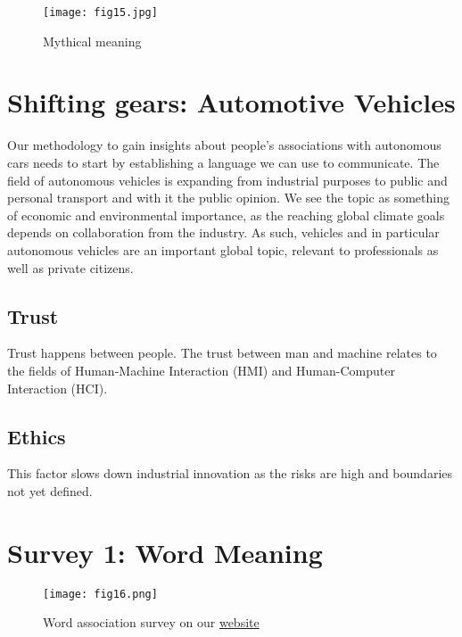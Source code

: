 \documentclass[12pt, usenames, dvipsnames]{report}
\begin{document}
\begin{flushleft}
\vspace*{1.2em}
\begin{figure}[!htbp]
  \hspace*{5em}
  \texttt{[image: fig15.jpg]}
  \caption{Mythical meaning}
  \label{fig:figure15}
\end{figure}
\vspace*{1.2em}


\section{Shifting gears: Automotive Vehicles}

Our methodology to gain insights about people's associations with autonomous cars needs to start by establishing a language we can use to communicate. 
The field of autonomous vehicles is expanding from industrial purposes to public and personal transport and with it the public opinion.
We see the topic as something of economic and environmental importance, as the reaching global climate goals depends on collaboration from the industry. 
As such, vehicles and in particular autonomous vehicles are an important global topic, relevant to professionals as well as private citizens.

\subsection{Trust}
\label{sec:trust}

Trust happens between people. 
The trust between man and machine relates to the fields of Human-Machine Interaction (HMI) and Human-Computer Interaction (HCI).

\subsection{Ethics}

This factor slows down industrial innovation as the risks are high and boundaries not yet defined.


\section{Survey 1: Word Meaning}

\vspace*{1.2em}
\begin{figure}[!htbp]
  \hspace*{-3.666em}
  \texttt{[image: fig16.png]}
  \caption{Word association survey on our \href{https://meaning.pub}{website}}
  \label{fig:figure16}
\end{figure}
\vspace*{1.2em}


\end{flushleft}
\end{document}
